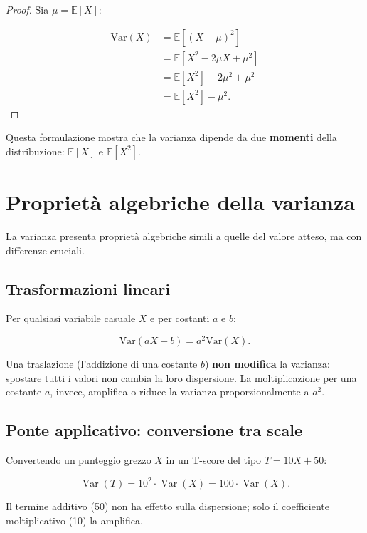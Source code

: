 \documentclass[
  italian,
  letterpaper,
  a4paper,
  11pt,
  open=any]{scrbook}
\theoremstyle{plain}
\theoremstyle{definition}
\theoremstyle{definition}
\theoremstyle{remark}
\begin{document}
\begin{proof}
Sia \(\mu = \mathbb{E}[X]\):

\begin{align*}
\text{Var}(X)
&= \mathbb{E}[(X - \mu)^2] \\
&= \mathbb{E}[X^2 - 2\mu X + \mu^2] \\
&= \mathbb{E}[X^2] - 2\mu^2 + \mu^2 \\
&= \mathbb{E}[X^2] - \mu^2.
\end{align*}
\end{proof}

Questa formulazione mostra che la varianza dipende da due
\textbf{momenti} della distribuzione: \(\mathbb{E}[X]\) e
\(\mathbb{E}[X^2]\).

\section{Proprietà algebriche della
varianza}\label{sec-variance-properties}

La varianza presenta proprietà algebriche simili a quelle del valore
atteso, ma con differenze cruciali.

\subsection{Trasformazioni lineari}\label{trasformazioni-lineari}

Per qualsiasi variabile casuale \(X\) e per costanti \(a\) e \(b\):

\[
\text{Var}(aX + b) = a^2 \text{Var}(X).
\]

Una traslazione (l'addizione di una costante \(b\)) \textbf{non
modifica} la varianza: spostare tutti i valori non cambia la loro
dispersione. La moltiplicazione per una costante \(a\), invece,
amplifica o riduce la varianza proporzionalmente a \(a^2\).

\subsection{Ponte applicativo: conversione tra
scale}\label{ponte-applicativo-conversione-tra-scale}

Convertendo un punteggio grezzo \(X\) in un T-score del tipo
\(T = 10X + 50\):

\[
\operatorname{Var}(T) = 10^2 \cdot \operatorname{Var}(X) = 100 \cdot \operatorname{Var}(X).
\]

Il termine additivo (50) non ha effetto sulla dispersione; solo il
coefficiente moltiplicativo (10) la amplifica.
\end{document}
